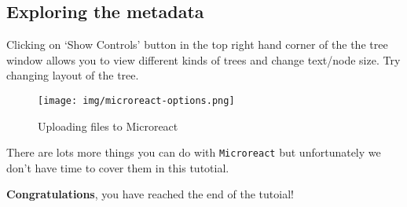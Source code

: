 \documentclass[11pt]{article}
\begin{document}
    \hypertarget{exploring-the-metadata}{%
\subsection{Exploring the metadata}\label{exploring-the-metadata}}

Clicking on `Show Controls' button in the top right hand corner of the
the tree window allows you to view different kinds of trees and change
text/node size. Try changing layout of the tree.

    \begin{figure}
\centering
\texttt{[image: img/microreact-options.png]}
\caption{Uploading files to Microreact}
\end{figure}

    There are lots more things you can do with \texttt{Microreact} but
unfortunately we don't have time to cover them in this tutotial.

\textbf{Congratulations}, you have reached the end of the tutoial!


\end{document}
